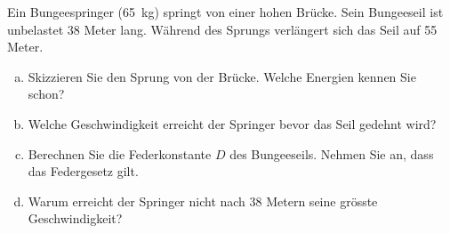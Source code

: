 

\begin{aufgabe}
	Ein Bungeespringer (\SI{65}{kg}) springt von einer hohen Brücke.
	Sein Bungeeseil ist unbelastet 38 Meter lang. Während des Sprungs verlängert sich das Seil auf 55 Meter.

	\begin{enumerate} [a)]
		\item Skizzieren Sie den Sprung von der Brücke. Welche Energien kennen Sie schon?
		\item Welche Geschwindigkeit erreicht der Springer bevor das Seil gedehnt wird?
		\item Berechnen Sie die Federkonstante $D$ des Bungeeseils. Nehmen Sie an, dass das Federgesetz gilt.
		\item Warum erreicht der Springer nicht nach 38 Metern seine grösste Geschwindigkeit?
	\end{enumerate}
\end{aufgabe}

